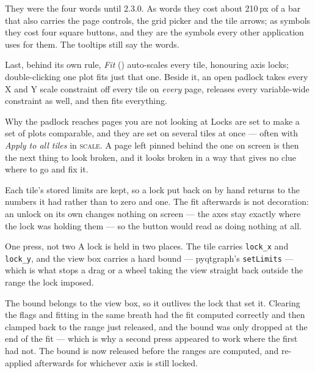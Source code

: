 \documentclass[11pt,a4paper,oneside]{report}
\newcommand{\code}[1]{\texttt{#1}}
\newcommand{\key}[1]{\textsf{\small\fbox{#1}}}
\newcommand{\tab}[1]{\textsc{#1}}
\begin{document}
They were the four words until 2.3.0. As words they cost about 210\,px of a bar
that also carries the page controls, the grid picker and the tile arrows; as
symbols they cost four square buttons, and they are the symbols every other
application uses for them. The tooltips still say the words.

Last, behind its own rule, \emph{Fit} (\key{Ctrl+0}) auto-scales every tile,
honouring axis locks; double-clicking one plot fits just that one. Beside it, an
open padlock takes every X and Y scale constraint off every tile on
\emph{every} page, releases every variable-wide constraint as well, and then
fits everything.

\begin{aoenote}{Why the padlock reaches pages you are not looking at}
Locks are set to make a set of plots comparable, and they are set on several
tiles at once --- often with \emph{Apply to all tiles} in \tab{scale}. A page
left pinned behind the one on screen is then the next thing to look broken, and
it looks broken in a way that gives no clue where to go and fix it.

Each tile's stored limits are kept, so a lock put back on by hand returns to the
numbers it had rather than to zero and one. The fit afterwards is not
decoration: an unlock on its own changes nothing on screen --- the axes stay
exactly where the lock was holding them --- so the button would read as doing
nothing at all.
\end{aoenote}

\begin{aoenote}{One press, not two}
A lock is held in two places. The tile carries \code{lock\_x} and
\code{lock\_y}, and the view box carries a hard bound --- pyqtgraph's
\code{setLimits} --- which is what stops a drag or a wheel taking the view
straight back outside the range the lock imposed.

The bound belongs to the view box, so it outlives the lock that set it.
Clearing the flags and fitting in the same breath had the fit computed
correctly and then clamped back to the range just released, and the bound was
only dropped at the end of the fit --- which is why a second press appeared to
work where the first had not. The bound is now released before the ranges are
computed, and re-applied afterwards for whichever axis is still locked.
\end{aoenote}
\end{document}
